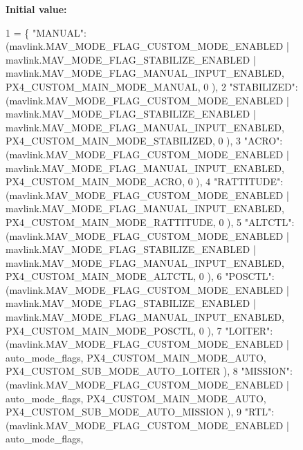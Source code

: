 {\bfseries Initial value\+:}
\begin{DoxyCode}
1 =  \{ \textcolor{stringliteral}{"MANUAL"}:        (mavlink.MAV\_MODE\_FLAG\_CUSTOM\_MODE\_ENABLED | mavlink.MAV\_MODE\_FLAG\_STABILIZE\_ENABLED 
      | mavlink.MAV\_MODE\_FLAG\_MANUAL\_INPUT\_ENABLED,   PX4\_CUSTOM\_MAIN\_MODE\_MANUAL,      0                         
                    ),
2             \textcolor{stringliteral}{"STABILIZED"}:    (mavlink.MAV\_MODE\_FLAG\_CUSTOM\_MODE\_ENABLED | 
      mavlink.MAV\_MODE\_FLAG\_STABILIZE\_ENABLED | mavlink.MAV\_MODE\_FLAG\_MANUAL\_INPUT\_ENABLED,   PX4\_CUSTOM\_MAIN\_MODE\_STABILIZED,  0                  
                           ),
3             \textcolor{stringliteral}{"ACRO"}:          (mavlink.MAV\_MODE\_FLAG\_CUSTOM\_MODE\_ENABLED |                                  
               mavlink.MAV\_MODE\_FLAG\_MANUAL\_INPUT\_ENABLED,   PX4\_CUSTOM\_MAIN\_MODE\_ACRO,        0                  
                           ),
4             \textcolor{stringliteral}{"RATTITUDE"}:     (mavlink.MAV\_MODE\_FLAG\_CUSTOM\_MODE\_ENABLED |                                  
               mavlink.MAV\_MODE\_FLAG\_MANUAL\_INPUT\_ENABLED,   PX4\_CUSTOM\_MAIN\_MODE\_RATTITUDE,   0                  
                           ),
5             \textcolor{stringliteral}{"ALTCTL"}:        (mavlink.MAV\_MODE\_FLAG\_CUSTOM\_MODE\_ENABLED | 
      mavlink.MAV\_MODE\_FLAG\_STABILIZE\_ENABLED | mavlink.MAV\_MODE\_FLAG\_MANUAL\_INPUT\_ENABLED,   PX4\_CUSTOM\_MAIN\_MODE\_ALTCTL,      0                  
                           ),
6             \textcolor{stringliteral}{"POSCTL"}:        (mavlink.MAV\_MODE\_FLAG\_CUSTOM\_MODE\_ENABLED | 
      mavlink.MAV\_MODE\_FLAG\_STABILIZE\_ENABLED | mavlink.MAV\_MODE\_FLAG\_MANUAL\_INPUT\_ENABLED,   PX4\_CUSTOM\_MAIN\_MODE\_POSCTL,      0                  
                           ),
7             \textcolor{stringliteral}{"LOITER"}:        (mavlink.MAV\_MODE\_FLAG\_CUSTOM\_MODE\_ENABLED | auto\_mode\_flags,                 
                                                             PX4\_CUSTOM\_MAIN\_MODE\_AUTO,        
      PX4\_CUSTOM\_SUB\_MODE\_AUTO\_LOITER         ),
8             \textcolor{stringliteral}{"MISSION"}:       (mavlink.MAV\_MODE\_FLAG\_CUSTOM\_MODE\_ENABLED | auto\_mode\_flags,                 
                                                             PX4\_CUSTOM\_MAIN\_MODE\_AUTO,        
      PX4\_CUSTOM\_SUB\_MODE\_AUTO\_MISSION        ),
9             \textcolor{stringliteral}{"RTL"}:           (mavlink.MAV\_MODE\_FLAG\_CUSTOM\_MODE\_ENABLED | auto\_mode\_flags,                 

\end{DoxyCode}
